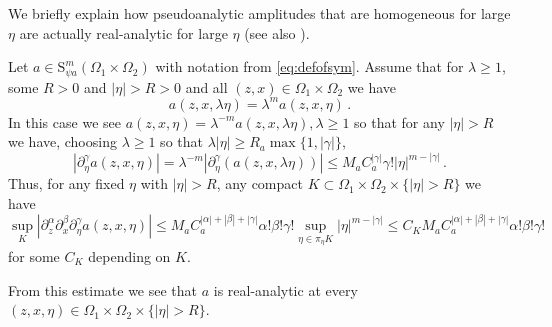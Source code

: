 \documentclass[
	fontsize=11pt, 
	twoside=false, 
	abstract=true, 
	a4paper,
]{scrartcl}
\newcommand{\sem}{\setminus\{0\}}
\newcommand{\RR}{\mathbb{R}}
\newcommand{\abs}[1]{\left\lvert#1\right\rvert}
\newcommand{\del}{\partial}
\begin{document}
%	
We briefly explain how pseudoanalytic amplitudes that are homogeneous for large $\eta$ are actually real-analytic for large $\eta$ (see also \cite[Lem.~17.2.25]{MR4436039}). 
\begin{remark}\label{rem:homisan}
	Let $a \in \mathrm{S}^m_{\psi a}(\Omega_1\times\Omega_2)$ with notation from \cref{eq:defofsym}. Assume that for $\lambda \geq 1$, some $R>0$ and $\abs{\eta} > R > 0$ and all $(z,x)\in\Omega_1\times\Omega_2$ we have
	\[
		a(z,x,\lambda\eta) = \lambda^m a(z,x,\eta)\,. %
	\]
	In this case we see $a(z,x,\eta) = \lambda^{-m}a(z,x,\lambda\eta), \lambda\geq 1$ so that for any $\abs{\eta} > R$ we have, choosing $\lambda \geq 1$ so that $\lambda\abs{\eta} \geq R_a\max\{1,\abs{\gamma}\}$,
	\[
		\abs{\del^\gamma_\eta a(z,x,\eta)} = \lambda^{-m}\abs{\del^\gamma_\eta (a(z,x,\lambda\eta))} %
		\leq M_aC_a^{\abs{\gamma}}\gamma!\abs{\eta}^{m-\abs{\gamma}}\,.
	\]
	Thus, for any fixed $\eta$ with $\abs{\eta} > R$, any compact $K \subset \Omega_1\times\Omega_2\times\{\abs{\eta} > R\}$ we have
	\[
		\sup_{K}\abs{\del^\alpha_z\del^\beta_x\del^\gamma_\eta a(z,x,\eta)} \leq M_a C_a^{\abs{\alpha}+\abs{\beta}+\abs{\gamma}} \alpha!\beta!\gamma! \sup_{\eta \in \pi_\eta K}\abs{\eta}^{m-\abs{\gamma}} \leq C_K M_a C_a^{\abs{\alpha}+\abs{\beta}+\abs{\gamma}} \alpha!\beta!\gamma! 
	\]
	for some $C_K$ depending on $K$. 

	From this estimate we see that $a$ is real-analytic at every $(z,x,\eta) \in \Omega_1\times\Omega_2\times\{\abs{\eta} > R\}$.
\end{remark}
\end{document}
